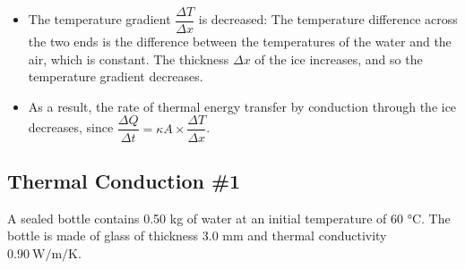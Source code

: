 \documentclass[a4paper,12pt]{article}
\begin{document}
\begin{itemize}
  \item The temperature gradient $\dfrac{\Delta T}{\Delta x}$ is decreased: The temperature difference across the two ends is the difference between the temperatures of the water and the air, which is constant. The thickness $\Delta x$ of the ice increases, and so the temperature gradient decreases.
  \item As a result, the rate of thermal energy transfer by conduction through the ice decreases, since $\dfrac{\Delta Q}{\Delta t} = \kappa A\times \dfrac{\Delta T}{\Delta x}$.

\end{itemize}

\pagebreak

\subsection{Thermal Conduction \#1}

A sealed bottle contains 0.50 kg of water at an initial temperature of 60 °C. The bottle is made of glass of thickness 3.0 mm and thermal conductivity $\SI{0.90}{\W\per\m\per\kelvin}$.
\end{document}
